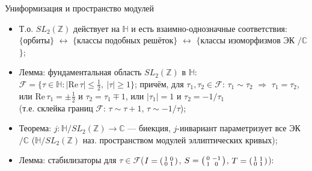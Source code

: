\documentclass[serif, aspectratio=169]{beamer}
\begin{document}
\begin{frame}{Униформизация и пространство модулей}
    \begin{itemize}
        \item Т.о. $SL_2(\mathbb{Z})$ действует на $\mathbb{H}$ и есть взаимно-однозначные соответствия:\\
        $\{$орбиты$\}$ $\leftrightarrow$ $\{$классы подобных решёток$\}$ $\leftrightarrow$ $\{$классы изоморфизмов ЭК $/\mathbb{C}$$\}$;
        \item \begin{minipage}[t]{0.7\linewidth} %
        \raggedright
        Лемма: фундаментальная область $SL_2(\mathbb{Z})$ в $\mathbb{H}$:\\ 
        $\mathcal{F}=\{\tau\in\mathbb{H}: |\mathrm{Re}\,\tau|\le\frac12,\ |\tau|\ge1\}$; причём, для $\tau_1,\tau_2\in\mathcal{F}$: $\tau_1\sim\tau_2$ $\Rightarrow$ $\tau_1=\tau_2$, или $\mathrm{Re}\,\tau_1=\pm\frac12$ и $\tau_2=\tau_1\mp1$, или $|\tau_1|=1$ и $\tau_2=-1/\tau_1$\\
        (т.е. склейка границ $\mathcal{F}$: $\tau\sim\tau+1$, $\tau\sim-1/\tau$);
        \end{minipage}\hfill
        \begin{minipage}[t]{0.3\linewidth}
            \centering
        \end{minipage}
        \item Теорема: $j:\mathbb{H}/SL_2(\mathbb{Z})\to\mathbb{C}$ --- биекция, $j$-инвариант параметризует все ЭК $/\mathbb{C}$ ($\mathbb{H}/SL_2(\mathbb{Z})$ наз. пространством модулей эллиптических кривых);
        \item Лемма: стабилизаторы для $\tau\in\mathcal{F}$\quad ($I=\begin{psmallmatrix}1&0\\0&1\end{psmallmatrix}$, $S=\begin{psmallmatrix}0&-1\\1&0\end{psmallmatrix}$, $T=\begin{psmallmatrix}1&1\\0&1\end{psmallmatrix}$):
$$
\end{itemize}
\end{frame}
\end{document}
